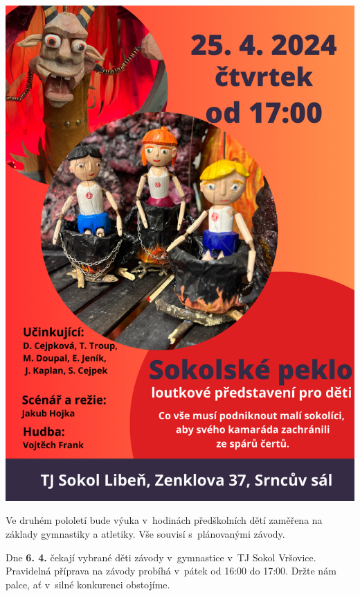 \documentclass[11pt]{article}
\begin{document}
\vspace*{12pt}
\hfill {}

\clearpage

\pagestyle{blank}
\begin{center}
  \noindent\includegraphics[width=\linewidth]{Sokolske_peklo_oprava.png}
\end{center}
\restoregeometry

\clearpage
\pagestyle{standard}

Ve druhém pololetí bude výuka v~hodinách předškolních dětí zaměřena na základy gymnastiky a atletiky. Vše souvisí s~plánovanými závody.

Dne \textbf{6. 4.} čekají vybrané děti závody v~gymnastice v~TJ Sokol Vršovice. Pravidelná příprava na závody probíhá v~pátek od 16:00 do 17:00. Držte nám palce, ať v~silné konkurenci obstojíme. 
\end{document}
